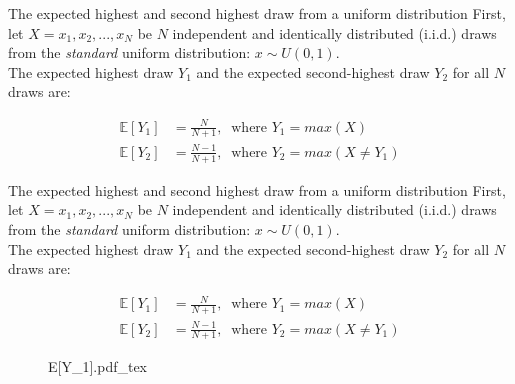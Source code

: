\begin{frame}{The expected highest and second highest draw from a uniform distribution}
    First, let $X=x_1,x_2,...,x_N$ be $N$ independent and identically distributed (i.i.d.) draws from the \textit{standard} uniform distribution: $x\sim U(0, 1)$.\\\smallskip
    The expected highest draw $Y_1$ and the expected second-highest draw $Y_2$ for all $N$ draws are: \vspace{-8pt}
    \begin{multicols}{2}
      \begin{align*}
        \mathbb{E}[Y_1]&=\frac{N}{N+1},\ \text{ where }Y_1=max(X)\\
        \mathbb{E}[Y_2]&=\frac{N-1}{N+1},\ \text{ where }Y_2=max(X\neq Y_1)
      \end{align*}
      \vfill\null\columnbreak
      \vfill\null
    \end{multicols}
\end{frame}
\begin{frame}{The expected highest and second highest draw from a uniform distribution}
    First, let $X=x_1,x_2,...,x_N$ be $N$ independent and identically distributed (i.i.d.) draws from the \textit{standard} uniform distribution: $x\sim U(0, 1)$.\\\smallskip
    The expected highest draw $Y_1$ and the expected second-highest draw $Y_2$ for all $N$ draws are: \vspace{-8pt}
    \begin{multicols}{2}
      \begin{align*}
        \mathbb{E}[Y_1]&=\frac{N}{N+1},\ \text{ where }Y_1=max(X)\\
        \mathbb{E}[Y_2]&=\frac{N-1}{N+1},\ \text{ where }Y_2=max(X\neq Y_1)
      \end{align*}
      \vfill\null\columnbreak
      \begin{figure}[!h]
        \center
        \def\svgwidth{1.1\columnwidth}
        {E[Y_1].pdf_tex}
      \end{figure}
      \vfill\null
    \end{multicols}
\end{frame}
